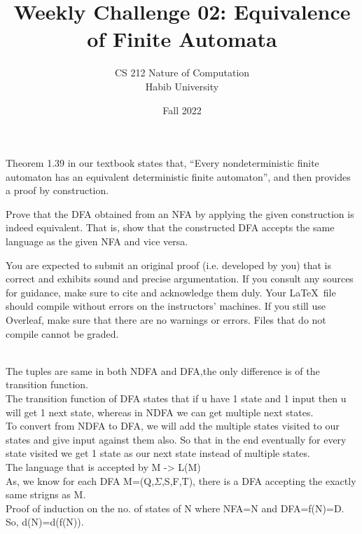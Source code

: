 \documentclass[a4paper]{exam}
\title{Weekly Challenge 02: Equivalence of Finite Automata}
\author{CS 212 Nature of Computation\\Habib University}
\date{Fall 2022}
\begin{document}
\maketitle

\begin{questions}
  

  Theorem 1.39 in our textbook states that, ``Every nondeterministic finite automaton has an equivalent deterministic finite automaton'', and then provides a proof by construction.

  Prove that the DFA obtained from an NFA by applying the given construction is indeed equivalent. That is, show that the constructed DFA accepts the same language as the given NFA and vice versa.
  
  You are expected to submit an original proof (i.e. developed by you) that is correct and exhibits sound and precise argumentation. If you consult any sources for guidance, make sure to cite and acknowledge them duly. Your \LaTeX\ file should compile without errors on the instructors' machines. If you still use Overleaf, make sure that there are no warnings or errors. Files that do not compile cannot be graded.
  
  \begin{solution}
    \\
    The tuples are same in both NDFA and DFA,the only difference is of the transition function.\\
    
    The transition function of DFA states that if u have 1 state and 1 input then u will get 1 next state, whereas in NDFA we can get multiple next states.\\
    
    To convert from NDFA to DFA, we will add the multiple states visited to our states and give input against them also. So that in the end eventually for every state visited we get 1 state as our next state instead of multiple states.\\
    
    The language that is accepted by M -> L(M)\\
    
    As, we know for each DFA M=(Q,$\Sigma$,S,F,T), there is a DFA accepting the exactly same strigns as M.\\
    
    Proof of induction on the no. of states of N where NFA=N and DFA=f(N)=D. So, d(N)=d(f(N)).\\
    

\end{solution}
\end{questions}
\end{document}
